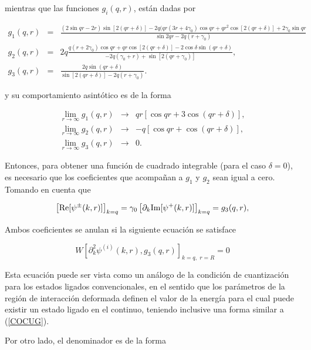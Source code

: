 mientras que las funciones $g_i(q,r)$, están dadas por

\begin{eqnarray*}
	g_1(q,r)&=&\frac{(2 \sin{qr} - 2r ) \sin{[2 (q r + \delta)]} - 
		2 q (q r (3 r + 4 \gamma_0) \cos{qr} + 
		q r^2 \cos{[2 (q r + \delta)]} + 2 \gamma_0 \sin{qr}}{\sin{2qr}-2q(r+\gamma_0)}\\[0.2cm] 
	g_2(q,r)&=& 2q \frac{q(r + 2 \gamma_0) \cos{qr} + qr \cos{[2(qr + \delta)]} - 
		2\cos{\delta} \sin{(q r + \delta)}}{-2q(\gamma_0+r)+\sin{[2(qr+\gamma_0)]}},\\[0.2cm] 
	g_3(q,r)&=&\frac{2q\sin{(qr + \delta)}}{\sin{[2(qr+\delta)]}-2q(r+\gamma_0)}. 
\end{eqnarray*}

y su comportamiento asintótico es de la forma

\begin{eqnarray*}
	\lim_{r\rightarrow\infty}g_1(q,r) & \rightarrow & qr[\cos{qr} + 3 \cos{(qr + \delta)}],\\[0.2cm]
	\lim_{r\rightarrow\infty}g_2(q,r) & \rightarrow & -q[\cos{qr} + \cos{(qr + \delta)}],\\[0.2cm]
	\lim_{r\rightarrow\infty}g_3(q,r) & \rightarrow & 0.
\end{eqnarray*}

Entonces, para obtener una función de cuadrado integrable (para el caso $\delta = 0$), es necesario que los coeficientes que acompañan a $g_1$ y $g_2$ sean igual a cero. Tomando en cuenta que

\begin{eqnarray}\left[{\rm Re}[\psi^{\pm}(k,r)]\right]_{k=q}=\gamma_0\left[\partial_k{\rm Im}[\psi^{+}(k,r)]\right]_{k=q}=g_3(q,r) \label{PFL},\end{eqnarray} 

Ambos coeficientes se anulan si la siguiente ecuación se satisface

\begin{equation*}
W[\partial^2_k \psi^{(i)}(k,r),g_3(q,r)]_{k=q,\,\,r=R} = 0 \label{CCBIC}
\end{equation*}

Esta ecuación puede ser vista como un análogo de la condición de cuantización para los estados ligados convencionales, en el sentido que los parámetros de la región de interacción deformada definen el valor de la energía para el cual puede existir un estado ligado en el continuo, teniendo inclusive una forma similar a (\ref{COCUG}).

Por otro lado, el denominador es de la forma

